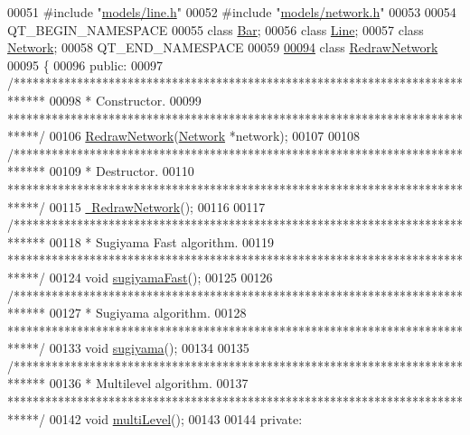 \begin{DoxyCode}
00051 \textcolor{preprocessor}{#include "\hyperlink{line_8h}{models/line.h}"}
00052 \textcolor{preprocessor}{#include "\hyperlink{network_8h}{models/network.h}"}
00053 
00054 QT\_BEGIN\_NAMESPACE
00055 \textcolor{keyword}{class }\hyperlink{class_bar}{Bar};
00056 \textcolor{keyword}{class }\hyperlink{class_line}{Line};
00057 \textcolor{keyword}{class }\hyperlink{class_network}{Network};
00058 QT\_END\_NAMESPACE
00059 
\hypertarget{redrawnetwork_8h_source_l00094}{}\hyperlink{class_redraw_network}{00094} \textcolor{keyword}{class }\hyperlink{class_redraw_network}{RedrawNetwork}
00095 \{
00096 \textcolor{keyword}{public}:
00097   \textcolor{comment}{/*****************************************************************************}
00098 \textcolor{comment}{  * Constructor.}
00099 \textcolor{comment}{  *****************************************************************************/}
00106   \hyperlink{class_redraw_network_a1fe3edb8c57780eb62f7de8f03dfeda3}{RedrawNetwork}(\hyperlink{class_network}{Network} *network);
00107 
00108   \textcolor{comment}{/*****************************************************************************}
00109 \textcolor{comment}{  * Destructor.}
00110 \textcolor{comment}{  *****************************************************************************/}
00115   \hyperlink{class_redraw_network_ac7b5f7fdb2b88e7d8bb580834e93b1e8}{~RedrawNetwork}();
00116 
00117   \textcolor{comment}{/*****************************************************************************}
00118 \textcolor{comment}{  * Sugiyama Fast algorithm.}
00119 \textcolor{comment}{  *****************************************************************************/}
00124   \textcolor{keywordtype}{void} \hyperlink{class_redraw_network_a94d53ddf8ee00c4ef6d56bb988333103}{sugiyamaFast}();
00125 
00126   \textcolor{comment}{/*****************************************************************************}
00127 \textcolor{comment}{  * Sugiyama algorithm.}
00128 \textcolor{comment}{  *****************************************************************************/}
00133   \textcolor{keywordtype}{void} \hyperlink{class_redraw_network_aee0ae606982145e66bba825421d610f8}{sugiyama}();
00134 
00135   \textcolor{comment}{/*****************************************************************************}
00136 \textcolor{comment}{  * Multilevel algorithm.}
00137 \textcolor{comment}{  *****************************************************************************/}
00142   \textcolor{keywordtype}{void} \hyperlink{class_redraw_network_a56a92ad06ae0198ee60160aa66aa0ce1}{multiLevel}();
00143 
00144 \textcolor{keyword}{private}:

\end{DoxyCode}
